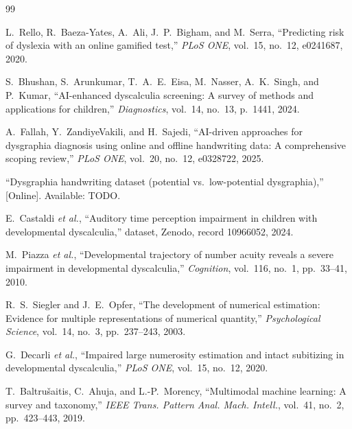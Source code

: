 \documentclass[conference]{IEEEtran}
\begin{document}
\begin{thebibliography}{99}

L.~Rello, R.~Baeza-Yates, A.~Ali, J.~P.~Bigham, and M.~Serra, ``Predicting risk of dyslexia with an online gamified test,'' \emph{PLoS ONE}, vol.~15, no.~12, e0241687, 2020.

S.~Bhushan, S.~Arunkumar, T.~A.~E.~Eisa, M.~Nasser, A.~K.~Singh, and P.~Kumar, ``AI-enhanced dyscalculia screening: A survey of methods and applications for children,'' \emph{Diagnostics}, vol.~14, no.~13, p.~1441, 2024.

A.~Fallah, Y.~ZandiyeVakili, and H.~Sajedi, ``AI-driven approaches for dysgraphia diagnosis using online and offline handwriting data: A comprehensive scoping review,'' \emph{PLoS ONE}, vol.~20, no.~12, e0328722, 2025.

``Dysgraphia handwriting dataset (potential vs.\ low-potential dysgraphia),'' [Online]. Available: TODO.

E.~Castaldi \emph{et al.}, ``Auditory time perception impairment in children with developmental dyscalculia,'' dataset, Zenodo, record 10966052, 2024.

M.~Piazza \emph{et al.}, ``Developmental trajectory of number acuity reveals a severe impairment in developmental dyscalculia,'' \emph{Cognition}, vol.~116, no.~1, pp.~33--41, 2010.

R.~S.~Siegler and J.~E.~Opfer, ``The development of numerical estimation: Evidence for multiple representations of numerical quantity,'' \emph{Psychological Science}, vol.~14, no.~3, pp.~237--243, 2003.

G.~Decarli \emph{et al.}, ``Impaired large numerosity estimation and intact subitizing in developmental dyscalculia,'' \emph{PLoS ONE}, vol.~15, no.~12, 2020.

T.~Baltru\v{s}aitis, C.~Ahuja, and L.-P.~Morency, ``Multimodal machine learning: A survey and taxonomy,'' \emph{IEEE Trans. Pattern Anal. Mach. Intell.}, vol.~41, no.~2, pp.~423--443, 2019.


\end{thebibliography}
\end{document}
